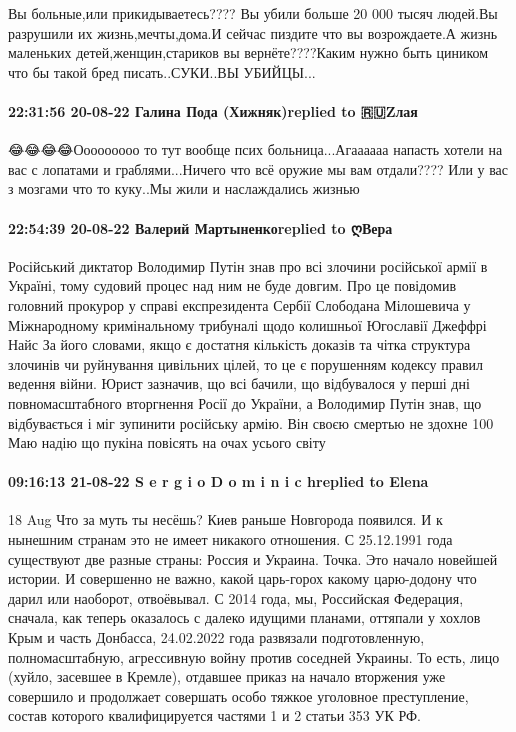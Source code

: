 Вы больные,или прикидываетесь???? Вы убили больше 20 000 тысяч людей.Вы
разрушили их жизнь,мечты,дома.И сейчас пиздите что вы возрождаете.А жизнь
маленьких детей,женщин,стариков вы вернёте????Каким нужно быть циником что бы
такой бред писать..СУКИ..ВЫ УБИЙЦЫ...

\paragraph{22:31:56 20-08-22 Галина Пода (Хижняк)replied to 🇷🇺Zлая}

😂😂😂😂Ооооооооо то тут вообще псих больница...Агаааааа напасть хотели на вас
с лопатами и граблями...Ничего что всё оружие мы вам отдали???? Или у вас з
мозгами что то куку..Мы жили и наслаждались жизнью

\paragraph{22:54:39 20-08-22 Валерий Мартыненкоreplied to ღВера}

Російський диктатор Володимир Путін знав про всі злочини російської армії в Україні, тому судовий процес над ним не буде довгим.
Про це повідомив головний прокурор у справі експрезидента Сербії Слободана Мілошевича у Міжнародному кримінальному трибуналі щодо колишньої Югославії Джеффрі Найс За його словами, якщо є достатня кількість доказів та чітка структура злочинів чи руйнування цивільних цілей, то це є порушенням кодексу правил ведення війни.
Юрист зазначив, що всі бачили, що відбувалося у перші дні повномасштабного вторгнення Росії до України, а Володимир Путін знав, що відбувається і міг зупинити російську армію.
Він своєю смертью не здохне 100%
Маю надію що пукіна повісять на очах усього світу

\paragraph{09:16:13 21-08-22 S e r g i o D o m i n i c hreplied to Elena}

18 Aug
Что за муть ты несёшь?
Киев раньше Новгорода появился.
И к нынешним странам это не имеет никакого отношения.
С 25.12.1991 года существуют две разные страны: Россия и Украина.
Точка. Это начало новейшей истории.
И совершенно не важно, какой царь-горох какому царю-додону что дарил или наоборот, отвоёвывал.
С 2014 года, мы, Российская Федерация, сначала, как теперь оказалось с далеко идущими планами, оттяпали у хохлов Крым и часть Донбасса, 24.02.2022 года развязали подготовленную, полномасштабную, агрессивную войну против соседней Украины.
То есть, лицо (хуйло, засевшее в Кремле), отдавшее приказ на начало вторжения уже совершило и продолжает совершать особо тяжкое уголовное преступление, состав которого квалифицируется частями 1 и 2 статьи 353 УК РФ.


